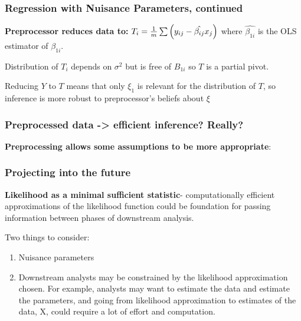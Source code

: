 \documentclass[10pt, compress]{beamer}
\begin{document}
\begin{frame}[fragile]
    \frametitle{Regression with Nuisance Parameters, continued}
   
    \textbf{Preprocessor reduces data to:} $T_i = \frac{1}{m}\sum\del{y_{ij} - \hat{\beta_{ij}}x_j}$ where $\hat{\beta_{1i}}$ is the OLS estimator of $\beta_{1i}$.
    
    \vspace*{5mm}
    
    Distribution of $T_i$ depends on $\sigma^2$ but is free of $B_{1i}$ so $T$ is a partial pivot. 
    
    Reducing $Y$ to $T$ means that only $\xi_1$ is relevant for the distribution of $T$, so inference is more robust to preprocessor's beliefs about $\xi$
    
    
    
\end{frame}

\begin{frame}[fragile]
    \frametitle{Preprocessed data -> efficient inference? Really?}

    
    \textbf{Preprocessing allows some assumptions to be more appropriate}:
    
    

\end{frame}

\begin{frame}[fragile]
    \frametitle{Projecting into the future}
    
    \textbf{Likelihood as a minimal sufficient statistic}- computationally efficient approximations of the likelihood function could be foundation for passing information between phases of downstream analysis.  
    
    Two things to consider:
    \begin{enumerate}
    \item Nuisance parameters 
    \item Downstream analysts may be constrained by the likelihood approximation chosen. For example, analysts may want to estimate the data and estimate the parameters, and going from likelihood approximation to estimates of the data, X, could require a lot of effort and computation.
    \end{enumerate}

\end{frame}
\end{document}

